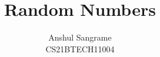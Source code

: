 \documentclass[journal,12pt,twocolumn]{IEEEtran}
\begin{document}
\providecommand{\dec}[2]{\ensuremath{\overset{#1}{\underset{#2}{\gtrless}}}}
\DeclarePairedDelimiter{\ceil}{\lceil}{\rceil}
\makeatletter
{}
\makeatother
\renewcommand{\thefigure}{\arabic{section}.\arabic{figure}}
\let\StandardTheFigure\thefigure
\let\StandardTheTable\thetable
\let\vec\mathbf
{}
\vspace{3cm}
\title{%
	Random Numbers
}
%
%
%
\author{Anshul Sangrame\\CS21BTECH11004}
\maketitle
\tableofcontents
\bigskip

\end{document}
